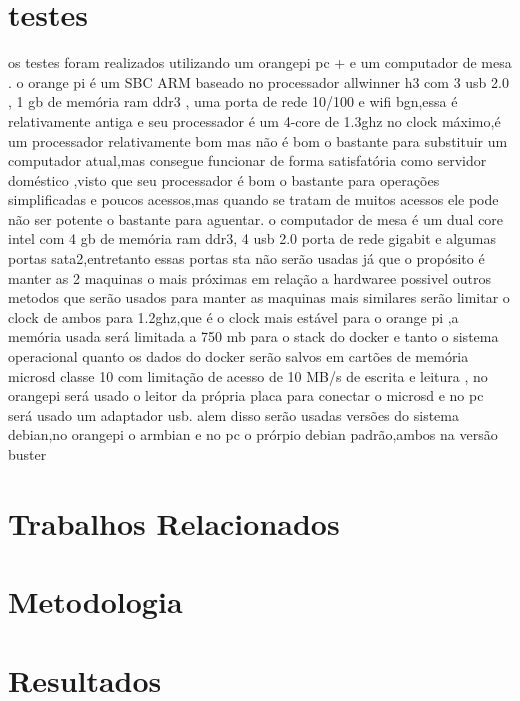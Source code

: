 \documentclass[
	12pt,				%
	openright,			%
	oneside,			%
	a4paper,			%
	english,			%
	french,				%
	spanish,			%
	brazil,				%
	]{abntex2}
\begin{document}
\chapter{testes}
\label{ch: testes}
os testes foram realizados utilizando um orangepi pc + e um computador de mesa .
o orange pi é um SBC ARM baseado no processador allwinner h3 com 3 usb 2.0 , 1 gb de memória ram ddr3 , uma porta de rede 10/100 e wifi bgn,essa é relativamente antiga e seu processador é um 4-core de 1.3ghz no clock máximo,é um processador relativamente bom mas não é bom o bastante para substituir um computador atual,mas consegue funcionar de forma satisfatória como servidor doméstico ,visto que seu processador é bom o bastante para operações simplificadas e poucos acessos,mas quando se tratam de muitos acessos ele pode não ser potente o bastante para aguentar.
o computador de mesa é um dual core intel com 4 gb de memória ram ddr3, 4 usb 2.0 porta de rede gigabit e algumas portas sata2,entretanto essas portas sta não serão usadas já que o propósito é manter as 2 maquinas o mais próximas em relação a hardwaree possivel
outros metodos que serão usados para manter as maquinas mais similares serão limitar o clock de ambos para 1.2ghz,que é o clock mais estável para o orange pi ,a memória usada será limitada a 750 mb para o stack do docker e tanto o sistema operacional quanto os dados do docker serão salvos em cartões de memória microsd classe 10 com limitação de acesso de 10 MB/s de escrita e leitura , no orangepi será usado o leitor da própria placa para conectar o microsd e no pc será usado um adaptador usb.
alem disso serão usadas versões do sistema debian,no orangepi o armbian e no pc o prórpio debian padrão,ambos na versão buster

\chapter{Trabalhos Relacionados}
\label{ch: trabalhos relacionados}

\chapter{Metodologia}
\label{ch: materiais e métodos}




\chapter{Resultados}
\label{ch: resultados} 
\end{document}
